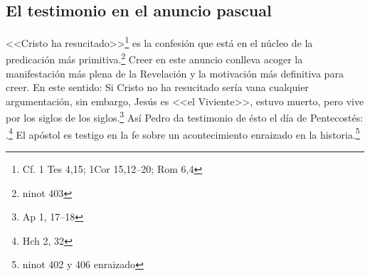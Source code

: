\subsection{El testimonio en el anuncio pascual}
<<Cristo ha resucitado>>\footnote{Cf. 1 Tes 4,15; 1Cor 15,12--20; Rom 6,4} es la
confesión que está en el núcleo de la predicación más primitiva.\footnote{ninot
  403} Creer en este anuncio conlleva acoger la manifestación más plena de la
Revelación y la motivación más definitiva para creer. En este sentido:
 Si Cristo no ha resucitado
sería vana cualquier argumentación, sin embargo, Jesús es <<el Viviente>>,
estuvo muerto, pero vive por los siglos de los siglos.\footnote{Ap 1, 17--18}
Así Pedro da testimonio de ésto el día de Pentecostés: .\footnote{Hch 2, 32} El apóstol es testigo en la fe sobre un
acontecimiento enraizado en la historia.\footnote{ninot 402 y 406 enraizado}

